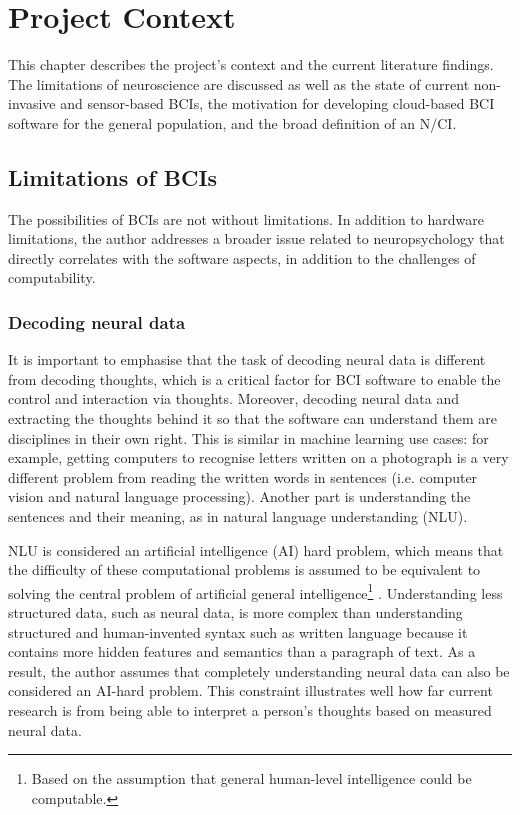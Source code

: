 \chapter{Project Context}
\graphicspath{{Chapter2/Figs/}{Chapter2/Figs/}}

This chapter describes the project’s context and the current literature findings. The limitations of neuroscience are discussed as well as the state of current non-invasive and sensor-based BCIs, the motivation for developing cloud-based BCI software for the general population, and the broad definition of an N/CI.

\section{Limitations of BCIs}
\label{chapter2-limitations-of-bcis}

The possibilities of BCIs are not without limitations. In addition to hardware limitations, the author addresses a broader issue related to neuropsychology that directly correlates with the software aspects, in addition to the challenges of computability.

\subsection{Decoding neural data}
\label{chapter2-decoding-neural-data}

It is important to emphasise that the task of decoding neural data is different from decoding thoughts, which is a critical factor for BCI software to enable the control and interaction via thoughts. Moreover, decoding neural data and extracting the thoughts behind it so that the software can understand them are disciplines in their own right. This is similar in machine learning use cases: for example, getting computers to recognise letters written on a photograph is a very different problem from reading the written words in sentences (i.e. computer vision and natural language processing). Another part is understanding the sentences and their meaning, as in natural language understanding (NLU).

NLU is considered an artificial intelligence (AI) hard problem, which means that the difficulty of these computational problems is assumed to be equivalent to solving the central problem of artificial general intelligence\footnote{Based on the assumption that general human-level intelligence could be computable.} \citep{demasi_theoretical_2010}. Understanding less structured data, such as neural data, is more complex than understanding structured and human-invented syntax such as written language because it contains more hidden features and semantics than a paragraph of text. As a result, the author assumes that completely understanding neural data can also be considered an AI-hard problem. This constraint illustrates well how far current research is from being able to interpret a person’s thoughts based on measured neural data.

